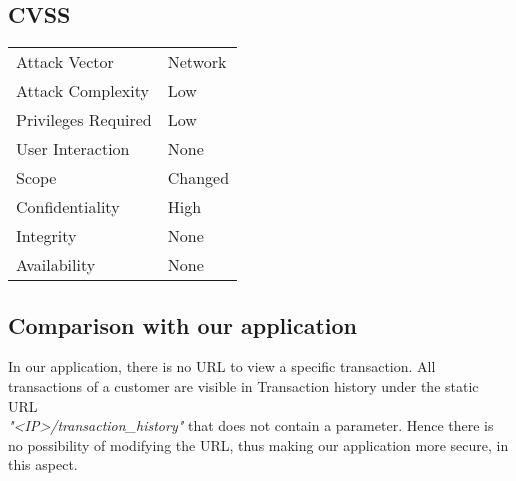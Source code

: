 \subsection{CVSS}
\begin{tabular}{l | l}
Attack Vector		& Network \\
Attack Complexity	& Low \\
Privileges Required & Low \\
User Interaction	& None \\
Scope				& Changed \\
Confidentiality		& High \\
Integrity			& None \\
Availability		& None
\end{tabular}

\subsection{Comparison with our application}
In our application, there is no URL to view a specific transaction. All transactions of a customer are visible in Transaction history under the static URL \\ 
\textit{"<IP>/transaction\_history"} that does not contain a parameter. Hence there is no possibility of modifying the URL, thus making our application more secure, in this aspect.
\clearpage